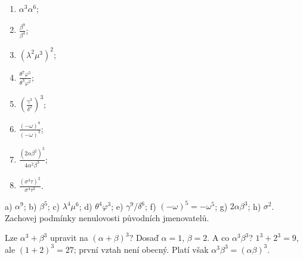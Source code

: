 \documentclass[11pt,a4paper]{article}
\begin{document}
\begin{zadaniReseniBox}[title={Samostatná práce 4 — osm řeckých příkladů}]
\begin{enumerate}[label=\alph*)]
\item $\alpha^3\alpha^6$; \item $\frac{\beta^9}{\beta^4}$;
\item $(\lambda^2\mu^3)^2$;
\item $\frac{\theta^7\varphi^5}{\theta^3\varphi^2}$;
\item $\left(\frac{\gamma^3}{\delta^2}\right)^3$;
\item $\frac{(-\omega)^8}{(-\omega)^3}$;
\item $\frac{(2\alpha\beta^2)^3}{4\alpha^2\beta^3}$;
\item $\frac{(\sigma^3\tau)^2}{\sigma^4\tau^2}$.
\end{enumerate}
\tcblower
 a) $\alpha^9$; b) $\beta^5$; c) $\lambda^4\mu^6$;
 d) $\theta^4\varphi^3$; e) $\gamma^9/\delta^6$;
 f) $(-\omega)^5=-\omega^5$; g) $2\alpha\beta^3$;
 h) $\sigma^2$. Zachovej podmínky nenulovosti původních jmenovatelů.
\end{zadaniReseniBox}
\begin{zadaniReseniBox}[title={Rozšiřující příklad 4 — protipříklad},breakable=false]
Lze $\alpha^3+\beta^3$ upravit na $(\alpha+\beta)^3$?
Dosaď $\alpha=1$, $\beta=2$. A co $\alpha^3\beta^3$?
\tcblower
$1^3+2^3=9$, ale $(1+2)^3=27$; první vztah není obecný.
Platí však $\alpha^3\beta^3=(\alpha\beta)^3$.
\end{zadaniReseniBox}
\end{document}
